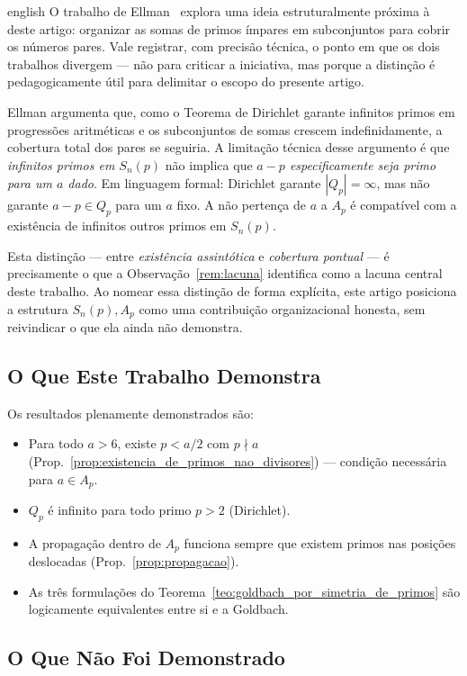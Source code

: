 \documentclass[a4paper,11pt]{article}
\theoremstyle{definition}
\theoremstyle{remark}
\begin{document}
\begin{otherlanguage*}{english}
		O trabalho de Ellman~\cite{Ellman2000} explora uma ideia estruturalmente próxima
		à deste artigo: organizar as somas de primos ímpares em subconjuntos para cobrir
		os números pares. Vale registrar, com precisão técnica, o ponto em que os dois
		trabalhos divergem — não para criticar a iniciativa, mas porque a distinção é
		pedagogicamente útil para delimitar o escopo do presente artigo.
		
		Ellman argumenta que, como o Teorema de Dirichlet garante infinitos primos em
		progressões aritméticas e os subconjuntos de somas crescem indefinidamente, a
		cobertura total dos pares se seguiria. A limitação técnica desse argumento é que
		\emph{infinitos primos em $S_n(p)$} não implica que \emph{$a - p$ especificamente
			seja primo para um $a$ dado}. Em linguagem formal: Dirichlet garante $|Q_p| = \infty$,
		mas não garante $a - p \in Q_p$ para um $a$ fixo. A não pertença de $a$ a $A_p$
		é compatível com a existência de infinitos outros primos em $S_n(p)$.
		
		Esta distinção — entre \emph{existência assintótica} e \emph{cobertura pontual} —
		é precisamente o que a Observação~\ref{rem:lacuna} identifica como a lacuna central
		deste trabalho. Ao nomear essa distinção de forma explícita, este artigo posiciona
		a estrutura $S_n(p), A_p$ como uma contribuição organizacional honesta, sem
		reivindicar o que ela ainda não demonstra.
		
		\subsection{O Que Este Trabalho Demonstra}
		
		Os resultados plenamente demonstrados são:
		\begin{itemize}
			\item Para todo $a > 6$, existe $p < a/2$ com $p \nmid a$
			(Prop.~\ref{prop:existencia_de_primos_nao_divisores}) — condição
			necessária para $a \in A_p$.
			\item $Q_p$ é infinito para todo primo $p > 2$ (Dirichlet).
			\item A propagação dentro de $A_p$ funciona sempre que existem primos nas
			posições deslocadas (Prop.~\ref{prop:propagacao}).
			\item As três formulações do Teorema~\ref{teo:goldbach_por_simetria_de_primos}
			são logicamente equivalentes entre si e a Goldbach.
		\end{itemize}
		
		\subsection{O Que Não Foi Demonstrado}
		

\end{otherlanguage*}
\end{document}
